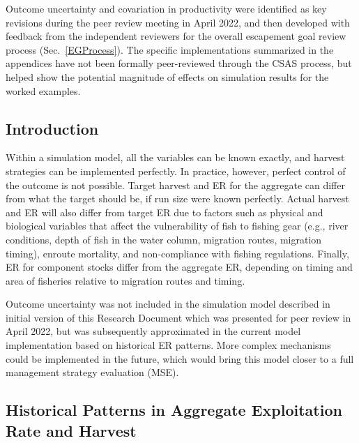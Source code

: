 \documentclass[french,11pt]{book}
\begin{document}
\endgroup{} \endgroup{}

\renewcommand{\thechapter}{F}
\starredchapter{APPENDIX~\thechapter. SIMULATION MODEL EXTENSIONS}\label{ModelExt}

Outcome uncertainty and covariation in productivity were identified as key revisions during the peer review meeting in April 2022, and then developed with feedback from the independent reviewers for the overall escapement goal review process (Sec.~\ref{EGProcess}). The specific implementations summarized in the appendices have not been formally peer-reviewed through the CSAS process, but helped show the potential magnitude of effects on simulation results for the worked examples.

\label{OutcomeUncApp}

\subsection{Introduction}\label{introduction-1}

Within a simulation model, all the variables can be known exactly, and harvest strategies can be implemented perfectly. In practice, however, perfect control of the outcome is not possible. Target harvest and ER for the aggregate can differ from what the target should be, if run size were known perfectly. Actual harvest and ER will also differ from target ER due to factors such as physical and biological variables that affect the vulnerability of fish to fishing gear (e.g., river conditions, depth of fish in the water column, migration routes, migration timing), enroute mortality, and non-compliance with fishing regulations. Finally, ER for component stocks differ from the aggregate ER, depending on timing and area of fisheries relative to migration routes and timing.

Outcome uncertainty was not included in the simulation model described in initial version of this Research Document which was presented for peer review in April 2022, but was subsequently approximated in the current model implementation based on historical ER patterns. More complex mechanisms could be implemented in the future, which would bring this model closer to a full management strategy evaluation (MSE).

\subsection{Historical Patterns in Aggregate Exploitation Rate and Harvest}\label{historical-patterns-in-aggregate-exploitation-rate-and-harvest}
\end{document}
